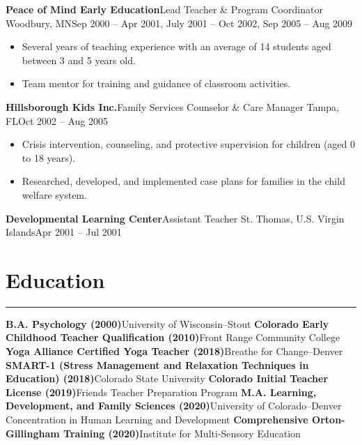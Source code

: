 \documentclass[letterpaper,10pt]{article}
\newcommand{\mblue}{\color{darkblue}}
\begin{document}
\pagebreak
\textbf{Peace of Mind Early Education}\hfill Lead Teacher \& Program Coordinator
\smallbreak Woodbury, MN\hfill Sep 2000 -- Apr 2001, July 2001 -- Oct 2002, Sep 2005 -- Aug 2009

\begin{itemize}
    \item Several years of teaching experience with an average of 14 students aged between 3 and 5 years old.
    \item Team mentor for training and guidance of classroom activities.
\end{itemize}

\vspace{1pc}
\textbf{Hillsborough Kids Inc.}\hfill Family Services Counselor \& Care Manager
\smallbreak Tampa, FL\hfill Oct 2002 -- Aug 2005

\begin{itemize}
    \item Crisis intervention, counseling, and protective supervision for children (aged 0 to 18 years).
    \item Researched, developed, and implemented case plans for families in the child welfare system.
\end{itemize}

\vspace{1pc}
\textbf{Developmental Learning Center}\hfill Assistant Teacher
\smallbreak St. Thomas, U.S. Virgin Islands\hfill Apr 2001 -- Jul 2001


\section*{\mblue Education}

\vspace{-2.15pc}
{\hfill\mblue\rule{5.845in}{0.02cm}}

\vspace{1pc}
\textbf{B.A. Psychology (2000)}\hfill University of Wisconsin--Stout
\bigbreak\textbf{Colorado Early Childhood Teacher Qualification (2010)}\hfill Front Range Community College
\bigbreak\textbf{Yoga Alliance Certified Yoga Teacher (2018)}\hfill Breathe for Change--Denver
\bigbreak\textbf{SMART-1 (Stress Management and Relaxation Techniques in Education) (2018)}\hfill Colorado State University
\bigbreak\textbf{Colorado Initial Teacher License (2019)}\hfill Friends Teacher Preparation Program
\bigbreak\textbf{M.A. Learning, Development, and Family Sciences (2020)}\hfill University of Colorado--Denver
\smallbreak Concentration in Human Learning and Development
\bigbreak\textbf{Comprehensive Orton-Gillingham Training (2020)}\hfill Institute for Multi-Sensory Education
\end{document}
